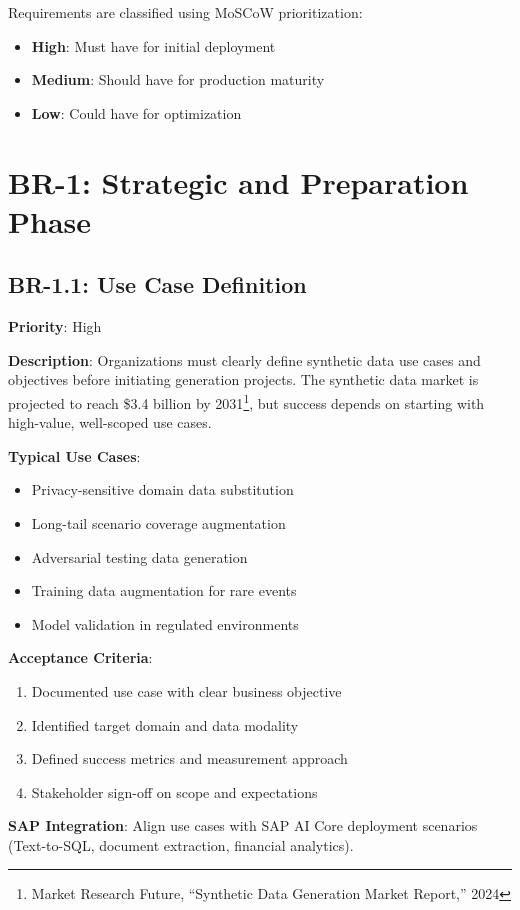 \documentclass[12pt,a4paper,twoside]{report}
\begin{document}
Requirements are classified using MoSCoW prioritization:
\begin{itemize}
\item \textbf{High}: Must have for initial deployment
\item \textbf{Medium}: Should have for production maturity
\item \textbf{Low}: Could have for optimization
\end{itemize}


\section{BR-1: Strategic and Preparation Phase}

\subsection{BR-1.1: Use Case Definition}

\begin{tcolorbox}[colback=blue!5,colframe=blue!70,title=BR-1.1: Clear Use Case Definition]
\textbf{Priority}: High

\textbf{Description}: Organizations must clearly define synthetic data use cases
and objectives before initiating generation projects. The synthetic data market
is projected to reach \$3.4 billion by 2031\footnote{Market Research Future,
``Synthetic Data Generation Market Report,'' 2024}, but success depends on
starting with high-value, well-scoped use cases.

\textbf{Typical Use Cases}:
\begin{itemize}
\item Privacy-sensitive domain data substitution
\item Long-tail scenario coverage augmentation
\item Adversarial testing data generation
\item Training data augmentation for rare events
\item Model validation in regulated environments
\end{itemize}

\textbf{Acceptance Criteria}:
\begin{enumerate}
\item Documented use case with clear business objective
\item Identified target domain and data modality
\item Defined success metrics and measurement approach
\item Stakeholder sign-off on scope and expectations
\end{enumerate}

\textbf{SAP Integration}: Align use cases with SAP AI Core deployment scenarios
(Text-to-SQL, document extraction, financial analytics).
\end{tcolorbox}
\end{document}
